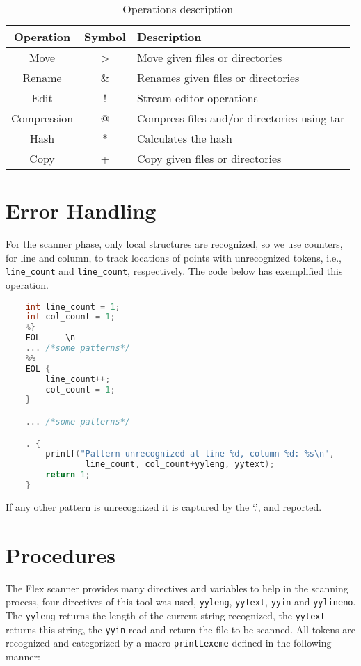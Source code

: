 \documentclass{article}
\begin{document}
\begin{table}[ht]
    \centering
    \caption{Operations description}
    \label{tab:operations}
    \begin{tabular}{|c|c|l|} \hline
        Operation   & Symbol & Description\\ \hline
        Move        & >      & Move given files or directories \\
        Rename      & \&     & Renames given files or directories \\
        Edit        & !      & Stream editor operations \\
        Compression & @      & Compress files and/or directories using tar \\
        Hash        & *     & Calculates the hash \\
        Copy        & +     & Copy given files or directories \\ \hline
    \end{tabular}
\end{table}

\section{Error Handling}
\label{sec:error}
For the scanner phase, only local structures are recognized, so we use counters,
for line and column, to track locations of points with unrecognized tokens,
i.e., \texttt{line_count} and \texttt{line_count}, respectively. The
code below has exemplified this operation.

\begin{lstlisting}[language=C, caption=Example of code monitoring lines and columns.]
    %{
    int line_count = 1;
    int col_count = 1;
    %}
    EOL     \n
    ... /*some patterns*/
    %%
    EOL {
        line_count++;
        col_count = 1;
    }

    ... /*some patterns*/

    . {
        printf("Pattern unrecognized at line %d, column %d: %s\n",
                line_count, col_count+yyleng, yytext);
        return 1;
    }
\end{lstlisting}

If any other pattern is unrecognized it is captured by the `.', and reported.

\section{Procedures}
\label{sec:proc}
The Flex scanner provides many directives and variables to help in the scanning
process, four directives of this tool was used, \texttt{yyleng},
\texttt{yytext}, \texttt{yyin} and \texttt{yylineno}. The \texttt{yyleng}
returns the length of the current string recognized, the \texttt{yytext}
returns this string, the \texttt{yyin} read and return the file to be scanned.
All tokens are recognized and categorized by a macro \texttt{printLexeme}
defined in the following manner:
\end{document}

